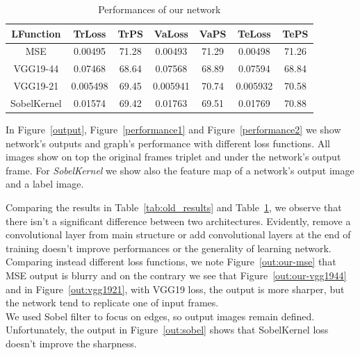 \documentclass[11pt, a4paper]{article}
\begin{document}
	\begin{table}
		\centering
		\begin{tabular}{|c|c|c|c|c|c|c|}
			\hline
			\textbf{LFunction} & \textbf{TrLoss} & \textbf{TrPS} & \textbf{VaLoss} & \textbf{VaPS} & \textbf{TeLoss} & \textbf{TePS}\\
			\hline
			MSE & 0.00495 & 71.28 & 0.00493 & 71.29 & 0.00498 & 71.26\\
			\hline
			VGG19-44 & 0.07468 & 68.64 & 0.07568 & 68.89 & 0.07594 & 68.84\\
			\hline
			VGG19-21 & 0.005498 & 69.45 & 0.005941 & 70.74 & 0.005932 & 70.58\\
			\hline
			SobelKernel & 0.01574 & 69.42 & 0.01763 & 69.51 & 0.01769 & 70.88\\
			\hline
		\end{tabular}
		\caption{Performances of our network}
		\label{tab:results}
	\end{table}

	In Figure~\ref{output}, Figure~\ref{performance1} and Figure~\ref{performance2} we show network's outputs and graph's performance with different loss functions. All images show on top the original frames triplet and under the network's output frame. For \textit{SobelKernel} we show also the feature map of a network's output image and a label image.
	
	\vspace{0.5cm}
	Comparing the results in Table~\ref{tab:old_results} and Table~\ref{tab:results}, we observe that there isn't a significant difference between two architectures. Evidently, remove a convolutional layer from main structure or add convolutional layers at the end of training doesn't improve performances or the generality of learning network.\\
	Comparing instead different loss functions, we note Figure~\ref{out:our-mse} that MSE output is blurry and on the contrary we see that Figure~\ref{out:our-vgg1944} and in Figure~\ref{out:vgg1921}, with VGG19 loss, the output is more sharper, but the network tend to replicate one of input frames.\\
	We used Sobel filter to focus on edges, so output images remain defined. Unfortunately, the output in Figure~\ref{out:sobel} shows that SobelKernel loss doesn't improve the sharpness.
	
	
\end{document}
